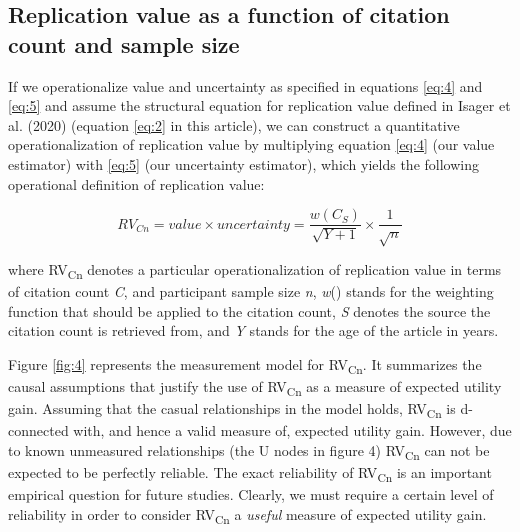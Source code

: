 \documentclass[
  english,
  jou,floatsintext]{apa6}
\begin{document}
\hypertarget{replication-value-as-a-function-of-citation-count-and-sample-size}{%
\subsection{Replication value as a function of citation count and sample size}\label{replication-value-as-a-function-of-citation-count-and-sample-size}}

If we operationalize value and uncertainty as specified in equations \eqref{eq:4} and \eqref{eq:5} and assume the structural equation for replication value defined in Isager et al. (2020) (equation \eqref{eq:2} in this article), we can construct a quantitative operationalization of replication value by multiplying equation \eqref{eq:4} (our value estimator) with \eqref{eq:5} (our uncertainty estimator), which yields the following operational definition of replication value:

\begin{equation} 
  \tag{6}
  RV_{Cn} = value\times uncertainty = \frac{w(C_{S})}{\sqrt{Y+1}}\times\frac{1}{\sqrt{n}}
  \label{eq:6}
\end{equation}

where RV\textsubscript{Cn} denotes a particular operationalization of replication value in terms of citation count \emph{C}, and participant sample size \emph{n}, \emph{w}() stands for the weighting function that should be applied to the citation count, \emph{S} denotes the source the citation count is retrieved from, and \emph{Y} stands for the age of the article in years.

Figure \ref{fig:4} represents the measurement model for RV\textsubscript{Cn}. It summarizes the causal assumptions that justify the use of RV\textsubscript{Cn} as a measure of expected utility gain. Assuming that the casual relationships in the model holds, RV\textsubscript{Cn} is d-connected with, and hence a valid measure of, expected utility gain. However, due to known unmeasured relationships (the U nodes in figure 4) RV\textsubscript{Cn} can not be expected to be perfectly reliable. The exact reliability of RV\textsubscript{Cn} is an important empirical question for future studies. Clearly, we must require a certain level of reliability in order to consider RV\textsubscript{Cn} a \emph{useful} measure of expected utility gain.
\end{document}
